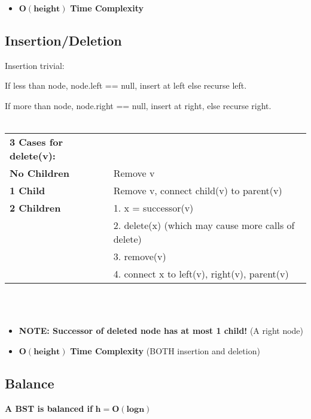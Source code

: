 \documentclass{article}
\begin{document}
    \begin{itemize}
        \item $\bm{O(height)}$ \textbf{Time Complexity}
    \end{itemize}


    \pagebreak

    \subsection{Insertion/Deletion}

    Insertion trivial:
    
    If less than node, node.left == null, insert at left else recurse left. 
    
    If more than node, node.right == null, insert at right, else recurse right.\\\\


    \noindent\begin{tabular}{ll}
        \toprule
        \textbf{3 Cases for delete(v):} & \\
        \textbf{No Children}& Remove v\\
        \hline
        \textbf{1 Child}& Remove v, connect child(v) to parent(v)\\
        \hline
        \textbf{2 Children}& 1. x = successor(v)\\
        & 2. delete(x) (which may cause more calls of delete)\\
        & 3. remove(v)\\
        & 4. connect x to left(v), right(v), parent(v)\\
        \bottomrule
    \end{tabular}\\\\

    \begin{itemize}
        \item \textbf{NOTE: Successor of deleted node has at most 1 child!} (A right node)
        \item $\bm{O(height)}$ \textbf{Time Complexity} (BOTH insertion and deletion)
    \end{itemize}

    \subsection{Balance}

    \textbf{A BST is balanced if }$\bm{h = O(log n)}$
\end{document}
